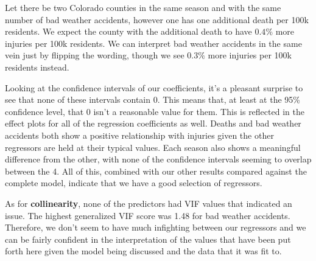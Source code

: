 Let there be two Colorado counties in the same season and with the same number of bad weather accidents, however one has one additional death per 100k residents. We expect the county with the additional death to have $0.4\%$ more injuries per 100k residents. We can interpret bad weather accidents in the same vein just by flipping the wording, though we see $0.3\%$ more injuries per 100k residents instead.

Looking at the confidence intervals of our coefficients, it's a pleasant surprise to see that none of these intervals contain 0. This means that, at least at the 95\% confidence level, that 0 isn't a reasonable value for them. This is reflected in the effect plots for all of the regression coefficients as well. Deaths and bad weather accidents both show a positive relationship with injuries given the other regressors are held at their typical values. Each season also shows a meaningful difference from the other, with none of the confidence intervals seeming to overlap between the 4. All of this, combined with our other results compared against the complete model, indicate that we have a good selection of regressors. 

As for \textbf{collinearity}, none of the predictors had VIF values that indicated an issue. The highest generalized VIF score was 1.48 for bad weather accidents. Therefore, we don't seem to have much infighting between our regressors and we can be fairly confident in the interpretation of the values that have been put forth here given the model being discussed and the data that it was fit to.